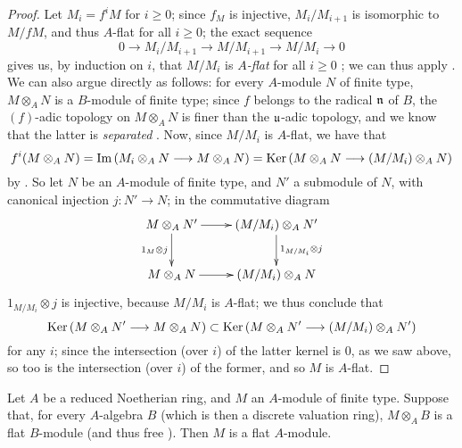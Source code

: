 \begin{proof}
\label{proof-0.10.2.7}
Let $M_i=f^iM$ for $i\geq0$;
since $f_M$ is injective, $M_i/M_{i+1}$ is isomorphic to $M/fM$, and thus $A$-flat for all $i\geq0$;
the exact sequence
\[
    0 \to M_i/M_{i+1} \to M/M_{i+1} \to M/M_i \to 0
\]
gives us, by induction on $i$, that $M/M_i$ is \emph{$A$-flat} for all $i\geq0$ ;
we can thus apply .
We can also argue directly as follows:
for every $A$-module $N$ of finite type, $M\otimes_A N$ is a $B$-module of finite type;
since $f$ belongs to the radical $\mathfrak{n}$ of $B$, the $(f)$-adic topology on $M\otimes_A N$ is finer than the
$\mathfrak{u}$-adic topology, and we know that the latter is \emph{separated} \sref[0\textsubscript{I},0.7.3.5].
Now, since $M/M_i$ is $A$-flat, we have that
\[
    f^i(M\otimes_A N) = \Im(M_i\otimes_A N \to  M\otimes_A N) = \Ker(M\otimes_A N \to (M/M_i)\otimes_A N)
\]
by .
So let $N$ be an $A$-module of finite type, and $N'$ a submodule of $N$, with canonical injection $j:N'\to N$;
in the commutative diagram
\[
  \xymatrix{
    M\otimes_A N' \ar[r] \ar[d]_{1_M\otimes j}
    & (M/M_i)\otimes_A N' \ar[d]^{1_{M/M_i}\otimes j}\\
    M\otimes_A N \ar[r]
    & (M/M_i)\otimes_A N
  }
\]
$1_{M/M_i}\otimes j$ is injective, because $M/M_i$ is $A$-flat;
we thus conclude that
\[
    \Ker(M\otimes_A N' \to M\otimes_A N) \subset \Ker(M\otimes_A N' \to (M/M_i)\otimes_A N')
\]
for any $i$;
since the intersection (over $i$) of the latter kernel is $0$, as we saw above, so too is the intersection (over $i$) of the former, and so $M$ is $A$-flat.
\end{proof}

\begin{prop}[10.2.8]
\label{0.10.2.8}
Let $A$ be a reduced Noetherian ring, and $M$ an $A$-module of finite type.
Suppose that, for every $A$-algebra $B$ (which is then a discrete valuation ring), $M\otimes_A B$ is a flat $B$-module (and thus free ).
Then $M$ is a flat $A$-module.
\end{prop}

